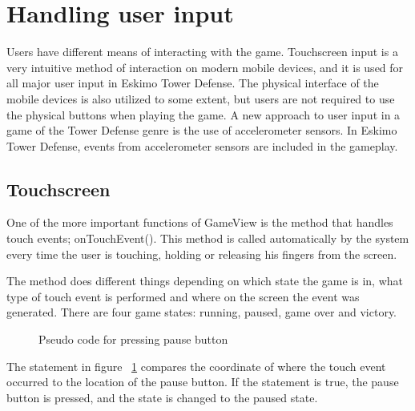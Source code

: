 \section{Handling user input}

Users have different means of interacting with the game. Touchscreen input is a very intuitive method of interaction on modern mobile devices, and it is used for all major user input in Eskimo Tower Defense. The physical interface of the mobile devices is also utilized to some extent, but users are not required to use the physical buttons when playing the game. A new approach to user input in a game of the Tower Defense genre is the use of accelerometer sensors. In Eskimo Tower Defense, events from accelerometer sensors are included in the gameplay.

\subsection{Touchscreen}

One of the more important functions of GameView is the method that handles touch events; onTouchEvent(). This method is called automatically by the system every time the user is touching, holding or releasing his fingers from the screen. 

The method does different things depending on which state the game is in, what type of touch event is performed and where on the screen the event was generated. There are four game states: running, paused, game over and victory.


\begin{figure}[htb]

\begin{small}

\end{small}

\caption{Pseudo code for pressing pause button}
\label{fig:codeExIn-GamePauseMenu}

\end{figure}


The statement in figure ~\ref{fig:codeExIn-GamePauseMenu} compares the coordinate of where the touch event occurred to the location of the pause button. If the statement is true, the pause button is pressed, and the state is changed to the paused state.


